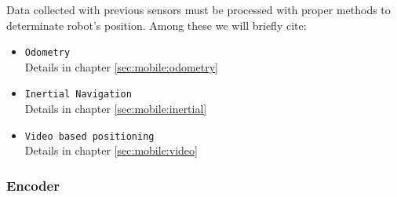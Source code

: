 Data collected with previous sensors must be processed with proper methods to
determinate robot's position. Among these we will briefly cite: 
\begin{itemize}
\item \texttt{Odometry} \\
  Details in chapter \ref{sec:mobile:odometry}
\item \texttt{Inertial Navigation} \\
  Details in chapter \ref{sec:mobile:inertial}
\item \texttt{Video based positioning} \\
  Details in chapter \ref{sec:mobile:video}
\end{itemize}


\subsubsection{Encoder}
\label{sec:mobile:encoder}


